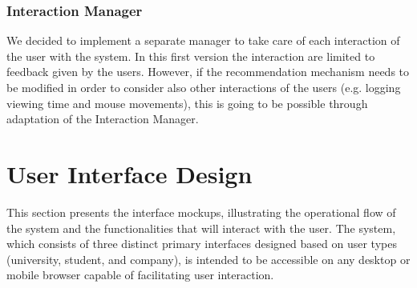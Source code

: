 \documentclass[a4paper,12pt]{article}
\begin{document}
\subsubsection{Interaction Manager}
We decided to implement a separate manager to take care of each interaction of the user with the system. In this first version the interaction are limited to feedback given by the users. However, if the recommendation mechanism needs to be modified in order to consider also other interactions of the users (e.g. logging viewing time and mouse movements), this is going to be possible through adaptation of the Interaction Manager.
\newpage

\section{User Interface Design}
This section presents the interface mockups, illustrating the operational flow of the system and the functionalities that will interact with the user. The system, which consists of three distinct primary interfaces designed based on user types (university, student, and company), is intended to be accessible on any desktop or mobile browser capable of facilitating user interaction.
\end{document}
